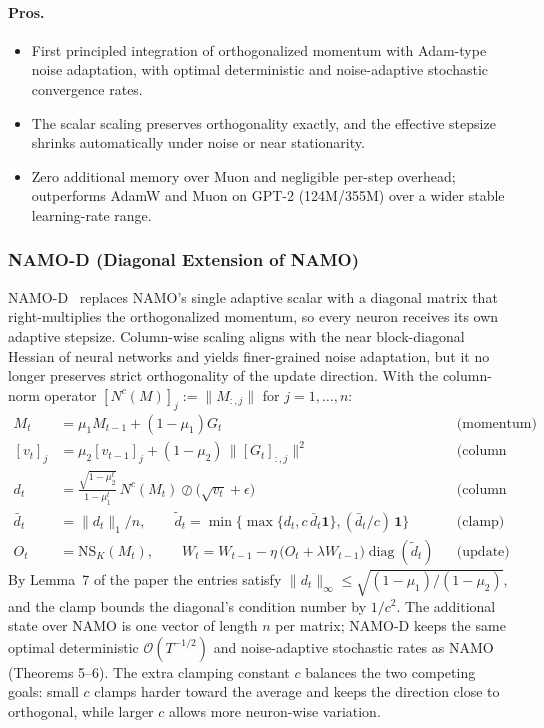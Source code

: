 \paragraph{Pros.}
\begin{itemize}[leftmargin=*]
\item First principled integration of orthogonalized momentum with Adam-type noise
  adaptation, with optimal deterministic and noise-adaptive stochastic convergence
  rates.
\item The scalar scaling preserves orthogonality exactly, and the effective stepsize
  shrinks automatically under noise or near stationarity.
\item Zero additional memory over Muon and negligible per-step overhead; outperforms
  AdamW and Muon on GPT-2 (124M/355M) over a wider stable learning-rate range.
\end{itemize}

\subsubsection{NAMO-D (Diagonal Extension of NAMO)}
NAMO-D~\citep{zhang_namo_2026} replaces NAMO's single adaptive scalar with a diagonal
matrix that right-multiplies the orthogonalized momentum, so every neuron receives its
own adaptive stepsize. Column-wise scaling aligns with the near block-diagonal Hessian
of neural networks and yields finer-grained noise adaptation, but it no longer preserves
strict orthogonality of the update direction. With the column-norm operator
$[N^c(M)]_j := \lVert M_{:,j}\rVert$ for $j=1,\dots,n$:
\begin{align}
M_t &= \mu_1 M_{t-1} + (1-\mu_1) G_t && \text{(momentum)} \\
[v_t]_j &= \mu_2 [v_{t-1}]_j + (1-\mu_2)\,\lVert [G_t]_{:,j}\rVert^2 && \text{(column norm EMA)} \\
d_t &= \frac{\sqrt{1-\mu_2^t}}{1-\mu_1^t}\,N^c(M_t) \oslash \bigl(\sqrt{v_t}+\epsilon\bigr) && \text{(column stepsizes)} \\
\bar d_t &= \lVert d_t\rVert_1/n, \qquad
\tilde d_t = \min\bigl\{\max\{d_t, c\,\bar d_t \mathbf 1\}, (\bar d_t/c)\,\mathbf 1\bigr\} && \text{(clamp)} \\
O_t &= \mathrm{NS}_K(M_t), \qquad
W_t = W_{t-1} - \eta\,\bigl(O_t + \lambda W_{t-1}\bigr)\operatorname{diag}(\tilde d_t) && \text{(update)}
\end{align}
By Lemma~7 of the paper the entries satisfy
$\lVert d_t\rVert_\infty \le \sqrt{(1-\mu_1)/(1-\mu_2)}$, and the clamp bounds the
diagonal's condition number by $1/c^2$. The additional state over NAMO is one vector of
length $n$ per matrix; NAMO-D keeps the same optimal deterministic
$\mathcal{O}(T^{-1/2})$ and noise-adaptive stochastic rates as NAMO (Theorems 5--6).
The extra clamping constant $c$ balances the two competing goals: small $c$ clamps
harder toward the average and keeps the direction close to orthogonal, while larger $c$
allows more neuron-wise variation.

